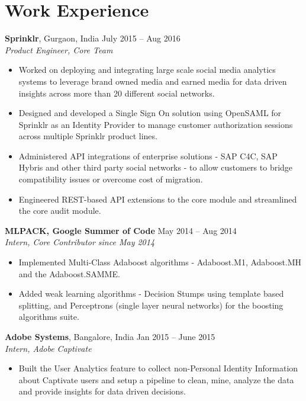 \documentclass[letterpaper]{article}
\begin{document}
\section*{Work Experience}
\textbf{Sprinklr}, Gurgaon, India \hfill July 2015 -- Aug 2016\\
\emph{Product Engineer, Core Team}\\
\vspace{-6mm}
\begin{itemize}
\item Worked on deploying and integrating large scale social media analytics systems to leverage brand owned media and earned media for data driven insights across more than 20 different social networks.
\vspace{-2mm}
\item Designed and developed a Single Sign On solution using OpenSAML for Sprinklr as an Identity Provider to manage customer authorization sessions across multiple Sprinklr product lines.
\vspace{-2mm}
\item Administered API integrations of enterprise solutions - SAP C4C, SAP Hybris and other third party social networks - to allow customers to bridge compatibility issues or overcome cost of migration. 
\vspace{-2mm}
\item Engineered REST-based API extensions to the core module and streamlined the core audit module.
\end{itemize}

\vspace{-0.6mm}
\textbf{MLPACK, Google Summer of Code} \hfill May 2014 -- Aug 2014\\
\emph{Intern, Core Contributor since May 2014}\\
\vspace{-6mm}
\begin{itemize}
\item Implemented Multi-Class Adaboost algorithms - Adaboost.M1, Adaboost.MH and the Adaboost.SAMME.
\vspace{-2mm}
\item Added weak learning algorithms - Decision Stumps using template based splitting, and Perceptrons (single layer neural networks) for the boosting algorithms suite.
\end{itemize}

\vspace{-0.5mm}
\textbf{Adobe Systems}, Bangalore, India \hfill Jan 2015 -- June 2015\\
\emph{Intern, Adobe Captivate}\\
\vspace{-6mm}
\begin{itemize}
\item Built the User Analytics feature to collect non-Personal Identity Information about Captivate users and setup a pipeline to clean, mine, analyze the data and provide insights for data driven decisions.
\end{itemize}
\end{document}
